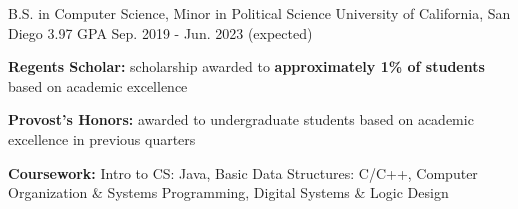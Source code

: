 

\begin{cventries}

    \cventry
    {B.S. in Computer Science, Minor in Political Science} %
    {University of California, San Diego} %
    {3.97 GPA} %
    {Sep. 2019 - Jun. 2023 (expected)} %
    {
      \begin{cvitems} %
        \item {\textbf{Regents Scholar:} scholarship awarded to \textbf{approximately 1\% of students} based on academic excellence}
        \item {\textbf{Provost's Honors:} awarded to undergraduate students based on academic excellence in previous quarters}
        \item {\textbf{Coursework:} Intro to CS: Java, Basic Data Structures: C/C++, Computer Organization \& Systems Programming, Digital Systems \& Logic Design}
      \end{cvitems}
    }

\end{cventries}
